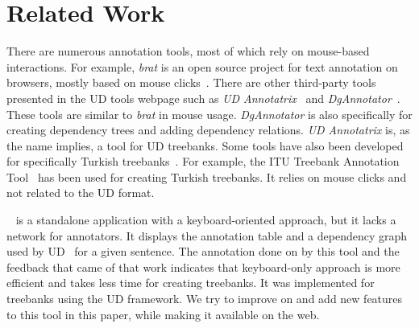 \section{Related Work}
\label{sec:related}

There are numerous annotation tools, most of which rely on mouse-based interactions.
For example, \textit{brat} is an open source project for text annotation on browsers, mostly based on mouse clicks~\cite{brat,UD}.
There are other third-party tools presented in the UD tools webpage such as \textit{UD Annotatrix}~\cite{tyers-etal:2018} and \textit{DgAnnotator}~\cite{dgannotator}.
These tools are similar to \textit{brat} in mouse usage.
\textit{DgAnnotator} is also specifically for creating dependency trees and adding dependency relations.
\textit{UD Annotatrix} is, as the name implies, a tool for UD treebanks.
Some tools have also been developed for specifically Turkish treebanks~\cite{turk-etal-2019-turkish}.
For example, the ITU Treebank Annotation Tool~\cite{pamay-etal-2015-annotation} has been used for creating Turkish treebanks.
It relies on mouse clicks and not related to the UD format.

\boatvone~\cite{turk-etal-2019-turkish} is a standalone application with a keyboard-oriented approach, but it lacks a network for annotators.
It displays the annotation table and a dependency graph used by UD~\cite{UD} for a given sentence.
The annotation done on \bountreebank{} by this tool and the feedback that came of that work indicates that keyboard-only approach is more efficient and takes less time for creating treebanks.
It was implemented for treebanks using the UD framework.
We try to improve on and add new features to this tool in this paper, while making it available on the web.
